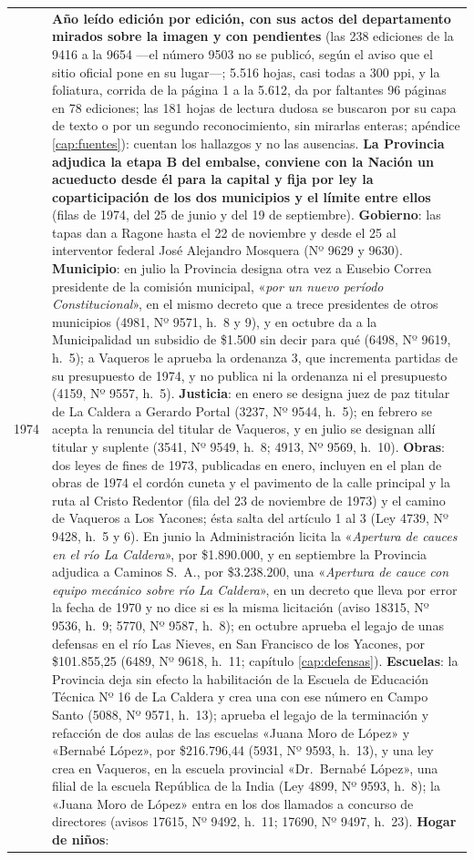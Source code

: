 \begin{longtable}{@{}p{2.7cm}p{10.3cm}@{}}
1974 & \textbf{Año leído edición por edición, con sus actos del departamento mirados sobre la imagen y con pendientes} (las 238 ediciones de la 9416 a la 9654 ---el número 9503 no se publicó, según el aviso que el sitio oficial pone en su lugar---; 5.516 hojas, casi todas a 300 ppi, y la foliatura, corrida de la página 1 a la 5.612, da por faltantes 96 páginas en 78 ediciones; las 181 hojas de lectura dudosa se buscaron por su capa de texto o por un segundo reconocimiento, sin mirarlas enteras; apéndice \ref{cap:fuentes}): cuentan los hallazgos y no las ausencias. \textbf{La Provincia adjudica la etapa B del embalse, conviene con la Nación un acueducto desde él para la capital y fija por ley la coparticipación de los dos municipios y el límite entre ellos} (filas de 1974, del 25 de junio y del 19 de septiembre). \textbf{Gobierno}: las tapas dan a Ragone hasta el 22 de noviembre y desde el 25 al interventor federal José Alejandro Mosquera (Nº 9629 y 9630). \textbf{Municipio}: en julio la Provincia designa otra vez a Eusebio Correa presidente de la comisión municipal, «\textit{por un nuevo período Constitucional}», en el mismo decreto que a trece presidentes de otros municipios (4981, Nº 9571, h.\ 8 y 9), y en octubre da a la Municipalidad un subsidio de \$1.500 sin decir para qué (6498, Nº 9619, h.\ 5); a Vaqueros le aprueba la ordenanza 3, que incrementa partidas de su presupuesto de 1974, y no publica ni la ordenanza ni el presupuesto (4159, Nº 9557, h.\ 5). \textbf{Justicia}: en enero se designa juez de paz titular de La Caldera a Gerardo Portal (3237, Nº 9544, h.\ 5); en febrero se acepta la renuncia del titular de Vaqueros, y en julio se designan allí titular y suplente (3541, Nº 9549, h.\ 8; 4913, Nº 9569, h.\ 10). \textbf{Obras}: dos leyes de fines de 1973, publicadas en enero, incluyen en el plan de obras de 1974 el cordón cuneta y el pavimento de la calle principal y la ruta al Cristo Redentor (fila del 23 de noviembre de 1973) y el camino de Vaqueros a Los Yacones; ésta salta del artículo 1 al 3 (Ley 4739, Nº 9428, h.\ 5 y 6). En junio la Administración licita la «\textit{Apertura de cauces en el río La Caldera}», por \$1.890.000, y en septiembre la Provincia adjudica a Caminos S.\ A., por \$3.238.200, una «\textit{Apertura de cauce con equipo mecánico sobre río La Caldera}», en un decreto que lleva por error la fecha de 1970 y no dice si es la misma licitación (aviso 18315, Nº 9536, h.\ 9; 5770, Nº 9587, h.\ 8); en octubre aprueba el legajo de unas defensas en el río Las Nieves, en San Francisco de los Yacones, por \$101.855,25 (6489, Nº 9618, h.\ 11; capítulo \ref{cap:defensas}). \textbf{Escuelas}: la Provincia deja sin efecto la habilitación de la Escuela de Educación Técnica Nº 16 de La Caldera y crea una con ese número en Campo Santo (5088, Nº 9571, h.\ 13); aprueba el legajo de la terminación y refacción de dos aulas de las escuelas «Juana Moro de López» y «Bernabé López», por \$216.796,44 (5931, Nº 9593, h.\ 13), y una ley crea en Vaqueros, en la escuela provincial «Dr.\ Bernabé López», una filial de la escuela República de la India (Ley 4899, Nº 9593, h.\ 8); la «Juana Moro de López» entra en los dos llamados a concurso de directores (avisos 17615, Nº 9492, h.\ 11; 17690, Nº 9497, h.\ 23). \textbf{Hogar de niños}: 
\end{longtable}

